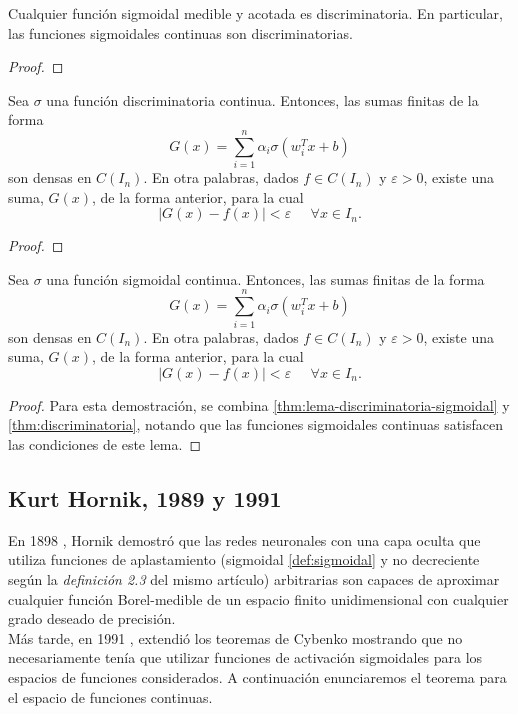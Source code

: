 \begin{lema}\label{thm:lema-discriminatoria-sigmoidal}
Cualquier función sigmoidal medible y acotada es discriminatoria. En particular, las funciones sigmoidales continuas son discriminatorias.
\end{lema}
\begin{proof}
\end{proof}

\begin{teorema}\label{thm:discriminatoria}
Sea $\sigma$ una función discriminatoria continua. Entonces, las sumas finitas de la forma $$G(x)=\sum_{i=1}^n \alpha_i \sigma(w_i^Tx+b)$$ son densas en $C(I_n)$. En otra palabras, dados $f\in C(I_n)$ y $\varepsilon>0$, existe una suma, $G(x)$, de la forma anterior, para la cual $$|G(x)-f(x)|<\varepsilon \;\;\;\;\; \forall x \in I_n.$$
\end{teorema}
\begin{proof}
\end{proof}
\begin{teorema}\label{thm:sigmoidal}
Sea $\sigma$ una función sigmoidal continua. Entonces, las sumas finitas de la forma $$G(x)=\sum_{i=1}^n \alpha_i \sigma(w_i^Tx+b)$$ son densas en $C(I_n)$. En otra palabras, dados $f\in C(I_n)$ y $\varepsilon>0$, existe una suma, $G(x)$, de la forma anterior, para la cual $$|G(x)-f(x)|<\varepsilon \;\;\;\;\; \forall x \in I_n.$$
\end{teorema}
\begin{proof}
Para esta demostración, se combina \autoref{thm:lema-discriminatoria-sigmoidal} y \autoref{thm:discriminatoria}, notando que las funciones sigmoidales continuas satisfacen las condiciones de este lema.
\end{proof}

\subsection{Kurt Hornik, 1989 y 1991}

En 1898 \cite{HornikEtAl89}, Hornik demostró que las redes neuronales con una capa oculta que utiliza funciones de aplastamiento (sigmoidal \autoref{def:sigmoidal} y no decreciente según la \emph{definición 2.3} del mismo artículo) arbitrarias son capaces de aproximar cualquier función Borel-medible de un espacio finito unidimensional con cualquier grado deseado de precisión.\\

Más tarde, en 1991 \cite{Kurt1991251}, extendió los teoremas de Cybenko mostrando que no necesariamente tenía que utilizar funciones de activación sigmoidales para los espacios de funciones considerados. A continuación enunciaremos el teorema para el espacio de funciones continuas.\\

